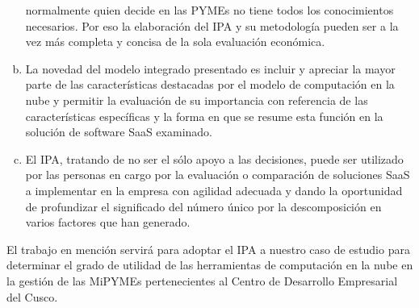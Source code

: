 \begin{enumerate}[a.]
            normalmente quien decide en las PYMEs no tiene todos los conocimientos
            necesarios. Por eso la elaboración del IPA y su metodología pueden
            ser a la vez más completa y concisa de la sola evaluación económica.
      \item La novedad del modelo integrado presentado es incluir y apreciar la
            mayor parte de las características destacadas por el modelo de computación
            en la nube y permitir la evaluación de su importancia con referencia
            de las características específicas y la forma en que se resume esta
            función en la solución de software SaaS examinado.
      \item El IPA, tratando de no ser el sólo apoyo a las decisiones, puede ser
            utilizado por las personas en cargo por la evaluación o comparación de
            soluciones SaaS a implementar en la empresa con agilidad adecuada y
            dando la oportunidad de profundizar el significado del número único
            por la descomposición en varios factores que han generado.
\end{enumerate}

El trabajo en mención servirá para adoptar el IPA a nuestro caso de estudio para
determinar el grado de utilidad de las herramientas de computación en la nube
en la gestión de las MiPYMEs pertenecientes al Centro de Desarrollo Empresarial
del Cusco.

